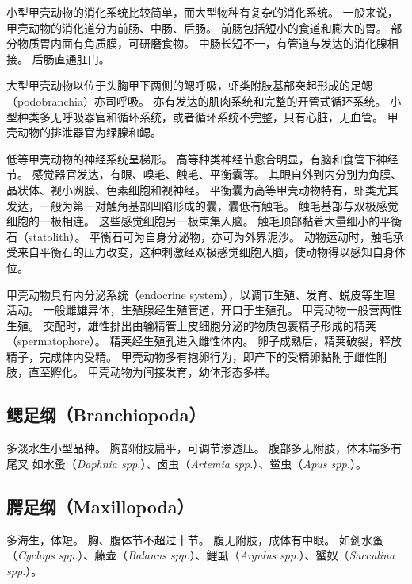 \documentclass[11pt]{article}
\begin{document}
\newline

小型甲壳动物的消化系统比较简单，而大型物种有复杂的消化系统。
一般来说，甲壳动物的消化道分为前肠、中肠、后肠。
前肠包括短小的食道和膨大的胃。
部分物质胃内面有角质膜，可研磨食物。
中肠长短不一，有管道与发达的消化腺相接。
后肠直通肛门。

\newline

大型甲壳动物以位于头胸甲下两侧的鳃呼吸，虾类附肢基部突起形成的足鳃（podobranchia）亦司呼吸。
亦有发达的肌肉系统和完整的开管式循环系统。
小型种类多无呼吸器官和循环系统，或者循环系统不完整，只有心脏，无血管。
甲壳动物的排泄器官为绿腺和鳃。

\newline

低等甲壳动物的神经系统呈梯形。
高等种类神经节愈合明显，有脑和食管下神经节。
感觉器官发达，有眼、嗅毛、触毛、平衡囊等。
其眼自外到内分别为角膜、晶状体、视小网膜、色素细胞和视神经。
平衡囊为高等甲壳动物特有，虾类尤其发达，一般为第一对触角基部凹陷形成的囊，囊低有触毛。
触毛基部与双极感觉细胞的一极相连。
这些感觉细胞另一极束集入脑。
触毛顶部黏着大量细小的平衡石（statolith）。
平衡石可为自身分泌物，亦可为外界泥沙。
动物运动时，触毛承受来自平衡石的压力改变，这种刺激经双极感觉细胞入脑，使动物得以感知自身体位。

\newline

甲壳动物具有内分泌系统（endocrine system），以调节生殖、发育、蜕皮等生理活动。
一般雌雄异体，生殖腺经生殖管道，开口于生殖孔。
甲壳动物一般营两性生殖。
交配时，雄性排出由输精管上皮细胞分泌的物质包裹精子形成的精荚（spermatophore）。
精荚经生殖孔进入雌性体内。
卵子成熟后，精荚破裂，释放精子，完成体内受精。
甲壳动物多有抱卵行为，即产下的受精卵黏附于雌性附肢，直至孵化。
甲壳动物为间接发育，幼体形态多样。

\subsection{鳃足纲（Branchiopoda）}
多淡水生小型品种。
胸部附肢扁平，可调节渗透压。
腹部多无附肢，体末端多有尾叉
如水蚤（\textit{Daphnia spp.}）、卤虫（\textit{Artemia spp.}）、鲎虫（\textit{Apus spp.}）。

\subsection{腭足纲（Maxillopoda）}
多海生，体短。
胸、腹体节不超过十节。
腹无附肢，成体有中眼。
如剑水蚤（\textit{Cyclops spp.}）、藤壶（\textit{Balanus spp.}）、鲤虱（\textit{Argulus spp.}）、蟹奴（\textit{Sacculina spp.}）。
\end{document}
